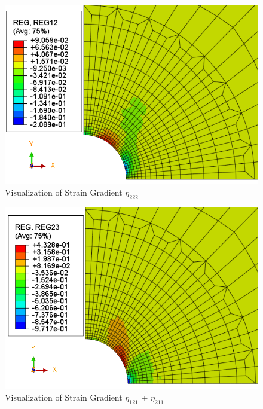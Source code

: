 \documentclass[12pt]{article}
\begin{document}
\begin{figure}[H]
	\begin{center}
		\includegraphics[scale=0.8]{Reg12_crop.png} 
	\end{center}  
   \caption{Visualization of Strain Gradient $\eta_{222} $}
\end{figure}
\begin{figure}[H]
	\begin{center}
		\includegraphics[scale=0.8]{Reg23_crop.png} 
	\end{center}  
   \caption{Visualization of Strain Gradient $\eta_{121}$ + $\eta_{211}$}
\end{figure}
\end{document}
